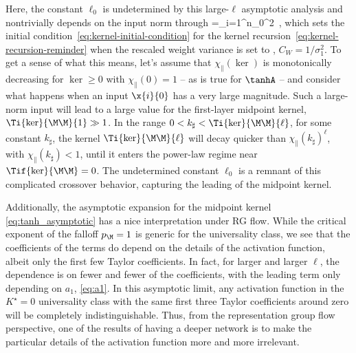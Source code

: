 Here, the constant $\ell_0$ is undetermined by this large-$\ell$ asymptotic analysis and nontrivially depends on the input norm through
\be
{}=\sum_{i=1}^{n_0}^2\, ,
\ee
which sets the initial condition~\eqref{eq:kernel-initial-condition} for the kernel recursion~\eqref{eq:kernel-recursion-reminder} when the rescaled weight variance is set to , $C_W=1/\sigma_1^2$.
To get a sense of what this means, let's assume that $\chi_{\parallel}(\ker)$ is monotonically decreasing for $\ker\geq0$ with $\chi_{\parallel}(0)=1$ -- as is true for $\tanhA$ --  and consider what happens when an input $\x{i}{0}$ has a very large magnitude. Such a large-norm input will lead to a large value for the first-layer midpoint kernel, $\Ti{\ker}{\M\M}{1} \gg 1$. 
In the range $0<k_{\sharp}<\Ti{\ker}{\M\M}{\ell}$, for some constant $k_{\sharp}$, the kernel $\Ti{\ker}{\M\M}{\ell}$ will decay quicker than $\chi_{\parallel}(k_{\sharp})^{\ell}$, with $\chi_\parallel(k_{\sharp})<1$, until it enters the power-law regime near $\Tif{\ker}{\M\M}=0$. The undetermined constant $\ell_0$ is
a remnant of this complicated crossover behavior, capturing the leading  of the midpoint kernel. 

Additionally, the asymptotic expansion for the midpoint kernel \eqref{eq:tanh_asymptotic} has a nice interpretation under RG flow. While the critical exponent of the falloff $p_\M=1$ is generic for the universality class, we see that the coefficients of the terms do depend on the details of the activation function, albeit only the first few Taylor coefficients. In fact, for larger and larger $\ell$, the dependence is on fewer and fewer of the coefficients, with the leading term only depending on $a_1$, \eqref{eq:a1}. In this asymptotic limit, any activation function in the $K^\star=0$ universality class with the same first three Taylor coefficients around zero will be completely indistinguishable. Thus, from the representation group flow perspective, one of the results of having a deeper network is to make the particular details of the activation function %
more and more irrelevant.

